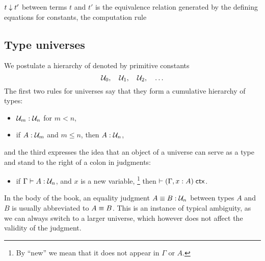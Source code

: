 \documentclass[hott-all.tex]{subfiles}
\begin{document}
$t \downarrow t'$ between terms $t$
and $t'$ is the equivalence relation generated by the defining equations for constants,
the computation rule

\subsection{Type universes}

We postulate a hierarchy of  denoted by primitive constants
%
\begin{equation*}
  \mathcal{U}_0, \quad \mathcal{U}_1, \quad  \mathcal{U}_2, \quad \ldots
\end{equation*}
%
The first two rules for universes say that they form a cumulative hierarchy of types:
%
\begin{itemize}
\item $\mathcal{U}_m : \mathcal{U}_n$ for $m < n$,
\item if $A:\mathcal{U}_m$ and $m \le n$, then $A:\mathcal{U}_n$,
\end{itemize}
%
and the third expresses the idea that an object of a universe can serve as a type and stand to the
right of a colon in judgments:
%
\begin{itemize}
\item if $\Gamma \vdash A : \mathcal{U}_n$, and $x$ is a new variable,%
\footnote{By ``new'' we mean that it does not appear in $\Gamma$ or $A$.}
then $\vdash (\Gamma, x:A)\; \mathsf{ctx}$.
\end{itemize}
%
In the body of the book, an equality judgment $A \equiv B : \mathcal{U}_n$ between types
$A$ and $B$ is usually abbreviated to $A \equiv B$. This is an instance of
typical ambiguity, as we can always switch to a larger universe, which however does not affect the validity of the judgment.
\end{document}

